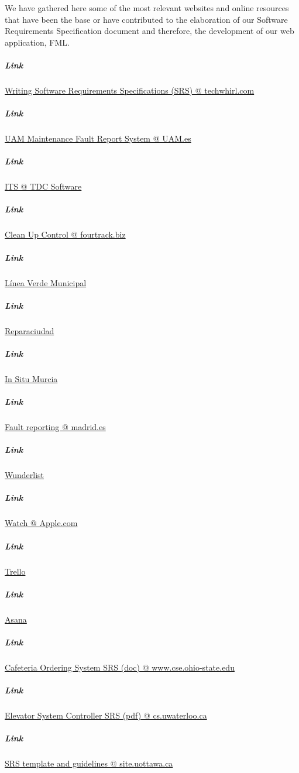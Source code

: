 We have gathered here some of the most relevant websites and online resources that have been the base or have contributed to the elaboration of our Software Requirements Specification document and therefore, the development of our web application, FML.

\subparagraph{Link} \href{http://techwhirl.com/writing-software-requirements-specifications/}{Writing Software Requirements Specifications (SRS) @ techwhirl.com}

\subparagraph{Link} \href{http://www.uam.es/ss/Satellite/es/1234886352057/1242647722813/servicio/servicio/Servicio_de_Mantenimiento.htm}{UAM Maintenance Fault Report System @ UAM.es}

\subparagraph{Link}\href{http://www.tdcsoftware.com/?q=en/node/15}{ITS @ TDC Software}

\subparagraph{Link}\href{http://www.fourtrack.biz/documents/castella/Clean-Up%20Control.pdf}{Clean Up Control @ fourtrack.biz}

\subparagraph{Link} \href{http://www.lineaverdemunicipal.com/Default.aspx}{Línea Verde Municipal}

\subparagraph{Link} \href{http://reparaciudad.com}{Reparaciudad}

\subparagraph{Link} \href{http://www.insitumurcia.es}{In Situ Murcia}

\subparagraph{Link} \href{https://sede.madrid.es/portal/site/tramites/menuitem.77902acb5cdfe761e8e4e8e4ecd08a0c/?vgnextoid=ce5ea38813180210VgnVCM100000c90da8c0RCRD}{Fault reporting @ madrid.es}

\subparagraph{Link} \href{http://wunderlist.com}{Wunderlist}

\subparagraph{Link} \href{https://www.apple.com/watch/}{Watch @ Apple.com}

\subparagraph{Link} \href{http://trello.com}{Trello}

\subparagraph{Link} \href{http://asana.com}{Asana}

\subparagraph{Link} \href{https://www.google.es/url?sa=t&rct=j&q=&esrc=s&source=web&cd=7&cad=rja&uact=8&ved=0CFsQFjAG&url=http%3A%2F%2Fwww.cse.ohio-state.edu%2F~igorm%2FCSE762%2FSP11%2FDocumentation%2FTemplates%2FCOS_SRS.doc&ei=aGbqVN3aBYHmUp-MgrgB&usg=AFQjCNFe2qSNcCKqmKozUPIb-N7_kGc3tA&sig2=09OHiEy6sOYQ88Ns_Xu_pQ&bvm=bv.86475890,d.d24}{Cafeteria Ordering System SRS (doc) @ www.cse.ohio-state.edu}

\subparagraph{Link} \href{https://cs.uwaterloo.ca/~dberry/ATRE/ElevatorSRSs/FinalSRSes/SRS-Alex-Kalaidjian.pdf}{Elevator System Controller SRS (pdf) @ cs.uwaterloo.ca}

\subparagraph{Link} \href{http://www.site.uottawa.ca/~shervin/courses/seg4105/project/SRS.html}{SRS template and guidelines @ site.uottawa.ca}
